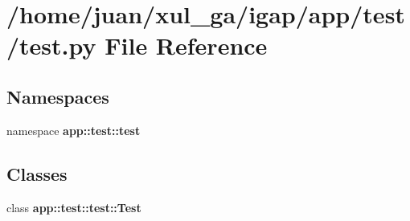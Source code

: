 \section{/home/juan/xul\_\-ga/igap/app/test/test.py File Reference}
\label{test_2test_8py}
\subsection*{Namespaces}
\begin{CompactItemize}
\item 
namespace {\bf app::test::test}
\end{CompactItemize}
\subsection*{Classes}
\begin{CompactItemize}
\item 
class {\bf app::test::test::Test}
\end{CompactItemize}
